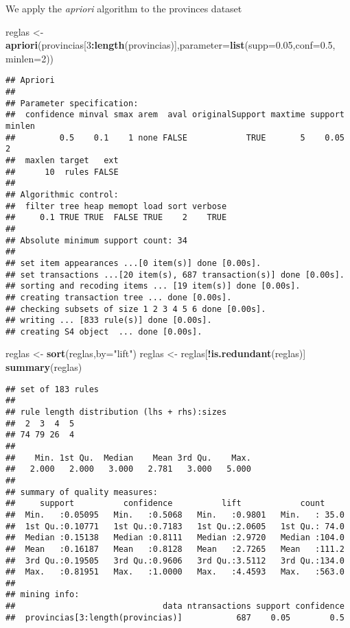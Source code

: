 \documentclass[
]{book}
\newenvironment{Shaded}{\begin{snugshade}}{\end{snugshade}}
\newcommand{\DataTypeTok}[1]{\textcolor[rgb]{0.13,0.29,0.53}{#1}}
\newcommand{\DecValTok}[1]{\textcolor[rgb]{0.00,0.00,0.81}{#1}}
\newcommand{\FloatTok}[1]{\textcolor[rgb]{0.00,0.00,0.81}{#1}}
\newcommand{\KeywordTok}[1]{\textcolor[rgb]{0.13,0.29,0.53}{\textbf{#1}}}
\newcommand{\NormalTok}[1]{#1}
\newcommand{\OperatorTok}[1]{\textcolor[rgb]{0.81,0.36,0.00}{\textbf{#1}}}
\newcommand{\StringTok}[1]{\textcolor[rgb]{0.31,0.60,0.02}{#1}}
\begin{document}
We apply the \emph{apriori} algorithm to the provinces dataset

\begin{Shaded}
\begin{Highlighting}[]
\NormalTok{reglas \textless{}{-}}\StringTok{ }\KeywordTok{apriori}\NormalTok{(provincias[}\DecValTok{3}\OperatorTok{:}\KeywordTok{length}\NormalTok{(provincias)],}\DataTypeTok{parameter=}\KeywordTok{list}\NormalTok{(}\DataTypeTok{supp=}\FloatTok{0.05}\NormalTok{,}\DataTypeTok{conf=}\FloatTok{0.5}\NormalTok{, }\DataTypeTok{minlen=}\DecValTok{2}\NormalTok{))}
\end{Highlighting}
\end{Shaded}

\begin{verbatim}
## Apriori
## 
## Parameter specification:
##  confidence minval smax arem  aval originalSupport maxtime support minlen
##         0.5    0.1    1 none FALSE            TRUE       5    0.05      2
##  maxlen target   ext
##      10  rules FALSE
## 
## Algorithmic control:
##  filter tree heap memopt load sort verbose
##     0.1 TRUE TRUE  FALSE TRUE    2    TRUE
## 
## Absolute minimum support count: 34 
## 
## set item appearances ...[0 item(s)] done [0.00s].
## set transactions ...[20 item(s), 687 transaction(s)] done [0.00s].
## sorting and recoding items ... [19 item(s)] done [0.00s].
## creating transaction tree ... done [0.00s].
## checking subsets of size 1 2 3 4 5 6 done [0.00s].
## writing ... [833 rule(s)] done [0.00s].
## creating S4 object  ... done [0.00s].
\end{verbatim}

\begin{Shaded}
\begin{Highlighting}[]
\NormalTok{reglas \textless{}{-}}\StringTok{ }\KeywordTok{sort}\NormalTok{(reglas,}\DataTypeTok{by=}\StringTok{"lift"}\NormalTok{)}
\NormalTok{reglas \textless{}{-}}\StringTok{ }\NormalTok{reglas[}\OperatorTok{!}\KeywordTok{is.redundant}\NormalTok{(reglas)]}
\KeywordTok{summary}\NormalTok{(reglas)}
\end{Highlighting}
\end{Shaded}

\begin{verbatim}
## set of 183 rules
## 
## rule length distribution (lhs + rhs):sizes
##  2  3  4  5 
## 74 79 26  4 
## 
##    Min. 1st Qu.  Median    Mean 3rd Qu.    Max. 
##   2.000   2.000   3.000   2.781   3.000   5.000 
## 
## summary of quality measures:
##     support          confidence          lift            count      
##  Min.   :0.05095   Min.   :0.5068   Min.   :0.9801   Min.   : 35.0  
##  1st Qu.:0.10771   1st Qu.:0.7183   1st Qu.:2.0605   1st Qu.: 74.0  
##  Median :0.15138   Median :0.8111   Median :2.9720   Median :104.0  
##  Mean   :0.16187   Mean   :0.8128   Mean   :2.7265   Mean   :111.2  
##  3rd Qu.:0.19505   3rd Qu.:0.9606   3rd Qu.:3.5112   3rd Qu.:134.0  
##  Max.   :0.81951   Max.   :1.0000   Max.   :4.4593   Max.   :563.0  
## 
## mining info:
##                              data ntransactions support confidence
##  provincias[3:length(provincias)]           687    0.05        0.5
\end{verbatim}
\end{document}
